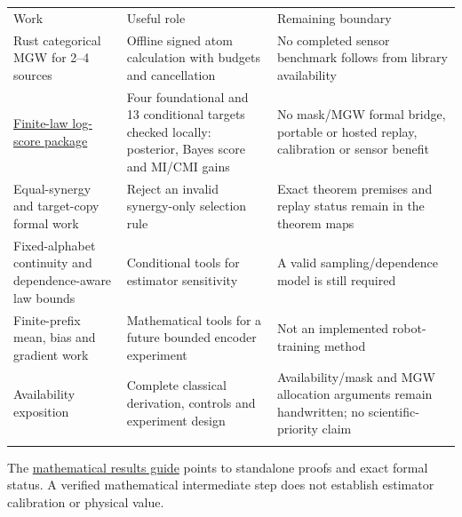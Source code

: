 \documentclass[11pt,a4paper]{article}
\newcounter{none}
\begin{document}
{\def\LTcaptype{none} %
\begin{longtable}[]{@{}
  >{\raggedright\arraybackslash}p{}
  >{\raggedright\arraybackslash}p{}
  >{\raggedright\arraybackslash}p{}@{}}
\toprule\noalign{}
\begin{minipage}[b]{\linewidth}\raggedright
Work
\end{minipage} & \begin{minipage}[b]{\linewidth}\raggedright
Useful role
\end{minipage} & \begin{minipage}[b]{\linewidth}\raggedright
Remaining boundary
\end{minipage} \\*
\midrule\noalign{}
\endhead
\bottomrule\noalign{}
\endfoot
Rust categorical MGW for 2--4 sources & Offline signed atom calculation with budgets and cancellation & No completed sensor benchmark follows from library availability \\*
\href{https://github.com/sepahead/pid-rs/blob/main/audit/formal/lean-finite-logscore/PUBLICATION.md}{Finite-law log-score package} & Four foundational and 13 conditional targets checked locally: posterior, Bayes score and MI/CMI gains & No mask/MGW formal bridge, portable or hosted replay, calibration or sensor benefit \\*
Equal-synergy and target-copy formal work & Reject an invalid synergy-only selection rule & Exact theorem premises and replay status remain in the theorem maps \\*
Fixed-alphabet continuity and dependence-aware law bounds & Conditional tools for estimator sensitivity & A valid sampling/dependence model is still required \\*
Finite-prefix mean, bias and gradient work & Mathematical tools for a future bounded encoder experiment & Not an implemented robot-training method \\*
Availability exposition & Complete classical derivation, controls and experiment design & Availability/mask and MGW allocation arguments remain handwritten; no scientific-priority claim \\*
\end{longtable}
}

The \href{https://github.com/sepahead/pid-rs/blob/main/MATHEMATICAL_RESULTS_GUIDE.md}{mathematical results guide} points to standalone proofs and exact formal status. A verified mathematical intermediate step does not establish estimator calibration or physical value.
\end{document}
